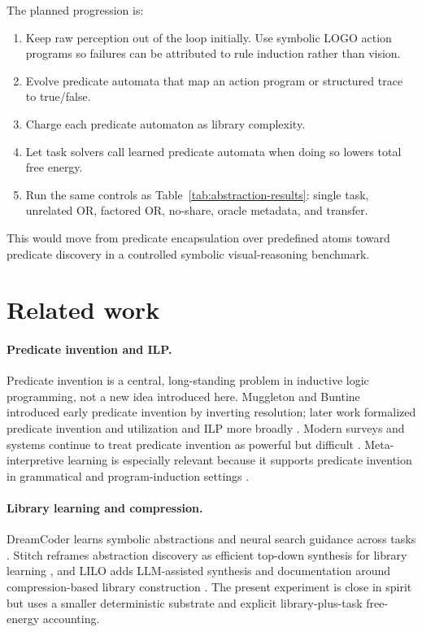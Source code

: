 \documentclass[11pt]{article}
\begin{document}
The planned progression is:
\begin{enumerate}[leftmargin=1.5em]
  \item Keep raw perception out of the loop initially. Use symbolic LOGO action
  programs so failures can be attributed to rule induction rather than vision.
  \item Evolve predicate automata that map an action program or structured trace
  to true/false.
  \item Charge each predicate automaton as library complexity.
  \item Let task solvers call learned predicate automata when doing so lowers
  total free energy.
  \item Run the same controls as Table~\ref{tab:abstraction-results}: single
  task, unrelated OR, factored OR, no-share, oracle metadata, and transfer.
\end{enumerate}
This would move from predicate encapsulation over predefined atoms toward
predicate discovery in a controlled symbolic visual-reasoning benchmark.

\section{Related work}

\paragraph{Predicate invention and ILP.}
Predicate invention is a central, long-standing problem in inductive logic
programming, not a new idea introduced here. Muggleton and Buntine
\cite{muggleton1988machine} introduced early predicate invention by inverting
resolution; later work formalized predicate invention and utilization
\cite{muggleton1994predicate} and ILP more broadly
\cite{muggletonderaedt1994ilp}. Modern surveys and systems continue to treat
predicate invention as powerful but difficult
\cite{cropper2021ilp30,cropper2021predicate}. Meta-interpretive learning is
especially relevant because it supports predicate invention in grammatical and
program-induction settings \cite{muggleton2014meta}.

\paragraph{Library learning and compression.}
DreamCoder learns symbolic abstractions and neural search guidance across tasks
\cite{ellis2020dreamcoder}. Stitch reframes abstraction discovery as efficient
top-down synthesis for library learning \cite{bowers2023stitch}, and LILO adds
LLM-assisted synthesis and documentation around compression-based library
construction \cite{grand2023lilo}. The present experiment is close in spirit but
uses a smaller deterministic substrate and explicit library-plus-task
free-energy accounting.
\end{document}
